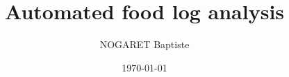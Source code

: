\documentclass[12pt]{book}
\title{Automated food log analysis}
\author{NOGARET Baptiste}
\date{\today}
\begin{document}
\frontmatter

\maketitle





\sstableofcontents

\sslistoffigures

\sslistoftables





%
%
\mainmatter





















\printbibliography
\end{document}
